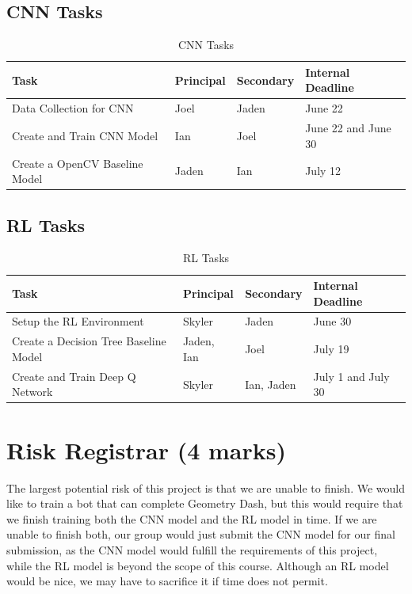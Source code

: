 \documentclass{article} %
\begin{document}
\subsection*{CNN Tasks}
\begin{table}[h!]
\centering
\begin{tabular}{|m{5cm}|m{3cm}|m{3cm}|m{3cm}|}
\hline
\textbf{Task} & \textbf{Principal} & \textbf{Secondary} & \textbf{Internal Deadline} \\ \hline
Data Collection for CNN & Joel & Jaden & June 22 \\ \hline
Create and Train CNN Model & Ian & Joel & June 22 and June 30 \\ \hline
Create a OpenCV Baseline Model & Jaden & Ian & July 12 \\ \hline
\end{tabular}
\caption{CNN Tasks}
\label{table:CNNTasks}
\end{table}

\subsection*{RL Tasks}
\begin{table}[h!]
\centering
\begin{tabular}{|m{5cm}|m{3cm}|m{3cm}|m{3cm}|}
\hline
\textbf{Task} & \textbf{Principal} & \textbf{Secondary} & \textbf{Internal Deadline} \\ \hline
Setup the RL Environment & Skyler & Jaden & June 30 \\ \hline
Create a Decision Tree Baseline Model & Jaden, Ian & Joel & July 19 \\ \hline
Create and Train Deep Q Network & Skyler & Ian, Jaden & July 1 and July 30 \\ \hline
\end{tabular}
\caption{RL Tasks}
\label{table:RLTasks}
\end{table}


\section{Risk Registrar (4 marks)}
The largest potential risk of this project is that we are unable to 
finish. We would like to train a bot that can complete Geometry Dash, 
but this would require that we finish training both the CNN model and 
the RL model in time. If we are unable to finish both, our group would 
just submit the CNN model for our final submission, as the CNN model 
would fulfill the requirements of this project, while the RL model is 
beyond the scope of this course. Although an RL model would be nice, 
we may have to sacrifice it if time does not permit. 
\end{document}
